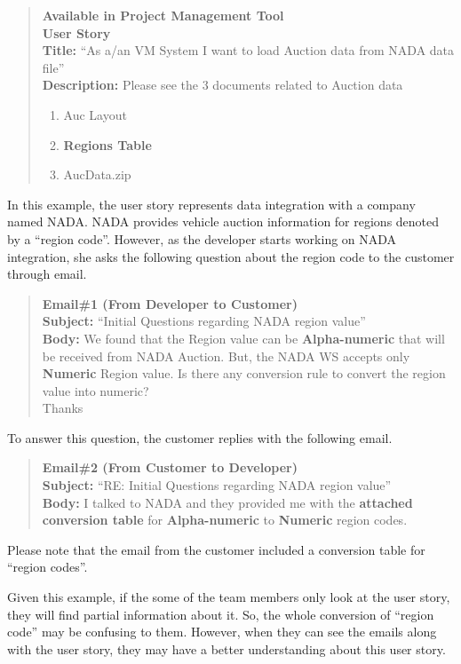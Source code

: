 \begin{quote}
	\textbf{Available in Project Management Tool}\\
	\textbf{User Story}\\
	\textbf{Title:} ``As a/an VM System I want to load Auction data from NADA data file''\\
	\textbf{Description:} Please see the 3 documents related to Auction data
	\begin{enumerate}
		\item Auc Layout
		\item \textbf{Regions Table}
		\item AucData.zip
	\end{enumerate}
\end{quote}

In this example, the user story represents data integration with a company named NADA. NADA provides vehicle auction information for regions denoted by a ``region code''. However, as the developer starts working on NADA integration, she asks the following question about the region code to the customer through email. 

\begin{quote}
\textbf{Email\#1 (From Developer to Customer)}\\
\textbf{Subject:} ``Initial Questions regarding NADA region value''\\
\textbf{Body:} We found that the Region value can be \textbf{Alpha-numeric} that will be received from NADA Auction. But, the NADA WS accepts only \textbf{Numeric} Region value. Is there any conversion rule to convert the region value into numeric? \\
Thanks
\end{quote}

To answer this question, the customer replies with the following email.

\begin{quote}
\textbf{Email\#2 (From Customer to Developer)}\\
\textbf{Subject:} ``RE: Initial Questions regarding NADA region value''\\
\textbf{Body:} I talked to NADA and they provided me with the \textbf{attached conversion table} for \textbf{Alpha-numeric} to \textbf{Numeric} region codes.
\end{quote}

Please note that the email from the customer included a conversion table for ``region codes''. 

Given this example, if the some of the team members only look at the user story, they will find partial information about it. So, the whole conversion of ``region code''  may be confusing to them. However, when they can see the emails along with the user story, they may have a better understanding about this user story.

